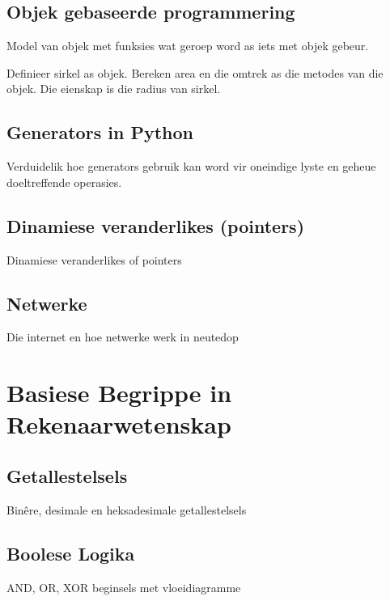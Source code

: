 \chapter[Objek gebaseerde programmering]
{Objek gebaseerde programmering}


Model van objek met funksies wat geroep word as iets met objek gebeur.

Definieer sirkel as objek.  Bereken area en die omtrek as die metodes van die objek.  Die eienskap is die radius van sirkel.

\chapter[Generators]
{Generators in Python}

Verduidelik hoe generators gebruik kan word vir oneindige lyste en geheue doeltreffende operasies.

\chapter{Dinamiese veranderlikes (pointers)}
{Dinamiese veranderlikes of pointers}



\chapter[Netwerke]
{Netwerke}

Die internet en hoe netwerke werk in neutedop




\part[Rekenaarwetenskap Beginsels]
{Basiese Begrippe in\\ Rekenaarwetenskap}

\chapter[Getallestelsels]
{Getallestelsels}

Bin\^ere, desimale en heksadesimale getallestelsels




\chapter[Boolese Logika]
{Boolese Logika}

AND, OR, XOR beginsels met vloeidiagramme


